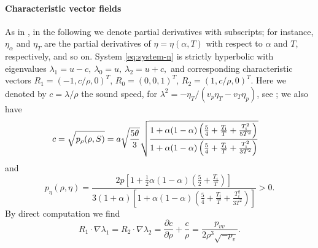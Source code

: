 \documentclass[10pt,a4paper]{article}
\newtheorem{nb}{Remark}[section]
\numberwithin{equation}{section}
\newcommand{\Ti}{T_{\rm i}}
\begin{document}
\paragraph{Characteristic vector fields}
As in \cite{Asakura-Corli_ionized}, in the following we denote partial derivatives with subscripts; for instance, $\eta_\alpha$ and $\eta_T$ are the partial derivatives of $\eta=\eta(\alpha,T)$ with respect to $\alpha$ and $T$, respectively, and so on. System \eqref{eq:system-n} is strictly hyperbolic with eigenvalues $\lambda_1 = u - c,\  \lambda_0 = u,\  \lambda_2 =  u + c,$ and corresponding characteristic vectors $R_1 = (-1, c/\rho, 0)^T$, $R_0 = (0,  0,  1 )^T$, $R_2 = (1, c/\rho, 0)^T$. Here we denoted by $c=\lambda/\rho$ the sound speed, for $\lambda^2=-\eta_T/(v_p\eta_T-v_T\eta_p)$, see \cite[(4.9)]{Asakura-Corli_ionized}; we also have 
\begin{align}
  c &= \sqrt{p_\rho(\rho,S)} = 
a\sqrt{\frac{5\theta}{3}}\sqrt{\frac{1 + \alpha(1 - \alpha)\left(\frac{5}{4} + \frac{\Ti}{T} + \frac{\Ti^2}{5T^2}\right)}{1 + \alpha(1 - \alpha)\left(\frac{5}{4} + \frac{\Ti}{T} + \frac{\Ti^2}{3T^2}\right)}}
\label{eq:euler characteristic speed}
\end{align}
and
\begin{equation}\label{e:pS}
	p_\eta(\rho,\eta)  = \frac{2p\left[1 + \frac{1}{2}\alpha(1 - \alpha)\left(\frac{5}{2}  + \frac{T_i}{T}\right)\right]}{3(1 + \alpha)\left[ 1 + \alpha(1 - \alpha)\left(\frac{5}{4}+   \frac{T_i}{T} +  \frac{T_i^2}{3T^2} \right)\right]} > 0.
\end{equation}
By direct computation we find
\begin{equation}\label{eq:p_vv}
  R_1\cdot \nabla \lambda_1 = R_2\cdot \nabla \lambda_2 = \frac{\partial c}{\partial \rho} + \frac{c}{\rho} = \frac{p_{vv}}{2\rho^3\sqrt{-p_v}}.
\end{equation}
%
\par 
\end{document}
